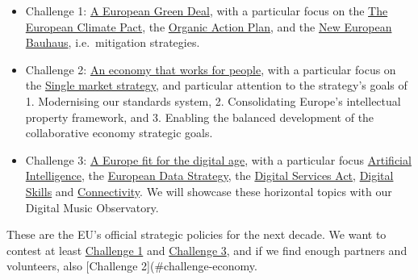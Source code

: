 \documentclass[
  a4paper,
  openany, a4paper, oneside]{book}
\providecommand{\tightlist}{%
  \setlength{\itemsep}{0pt}\setlength{\parskip}{0pt}}
\begin{document}
\begin{itemize}
\tightlist
\item
  Challenge 1: \href{https://ec.europa.eu/info/strategy/priorities-2019-2024/european-green-deal_en}{A European Green Deal}, with a particular focus on the \href{https://ec.europa.eu/commission/presscorner/detail/en/ip_20_2323}{The European Climate Pact}, the \href{https://ec.europa.eu/info/food-farming-fisheries/farming/organic-farming/organic-action-plan_en}{Organic Action Plan}, and the \href{https://ec.europa.eu/commission/presscorner/detail/en/IP_21_111}{New European Bauhaus}, i.e.~mitigation strategies.
\item
  Challenge 2: \href{https://ec.europa.eu/info/strategy/priorities-2019-2024/economy-works-people_en\#:~:text=Individuals\%20and\%20businesses\%20in\%20the,needs\%20of\%20the\%20EU's\%20citizens.}{An economy that works for people}, with a particular focus on the \href{https://ec.europa.eu/info/strategy/priorities-2019-2024/economy-works-people/internal-market_en}{Single market strategy}, and particular attention to the strategy's goals of 1. Modernising our standards system, 2. Consolidating Europe's intellectual property framework, and 3. Enabling the balanced development of the collaborative economy strategic goals.
\item
  Challenge 3: \href{https://ec.europa.eu/info/strategy/priorities-2019-2024/europe-fit-digital-age_en}{A Europe fit for the digital age}, with a particular focus \href{https://ec.europa.eu/info/strategy/priorities-2019-2024/europe-fit-digital-age/excellence-trust-artificial-intelligence_en}{Artificial Intelligence}, the \href{https://ec.europa.eu/info/strategy/priorities-2019-2024/europe-fit-digital-age/european-data-strategy_en}{European Data Strategy},
  the \href{https://ec.europa.eu/info/strategy/priorities-2019-2024/europe-fit-digital-age/digital-services-act-ensuring-safe-and-accountable-online-environment_en}{Digital Services Act}, \href{https://digital-strategy.ec.europa.eu/en/policies/digital-skills-and-jobs}{Digital Skills} and \href{https://digital-strategy.ec.europa.eu/en/policies/connectivity}{Connectivity}. We will showcase these horizontal topics with our Digital Music Observatory.
\end{itemize}

These are the EU's official strategic policies for the next decade. We want to contest at least \protect\hyperlink{challenge-green-deal}{Challenge 1} and \protect\hyperlink{challenge-digital-age}{Challenge 3}, and if we find enough partners and volunteers, also {[}Challenge 2{]}(\#challenge-economy.
\end{document}

